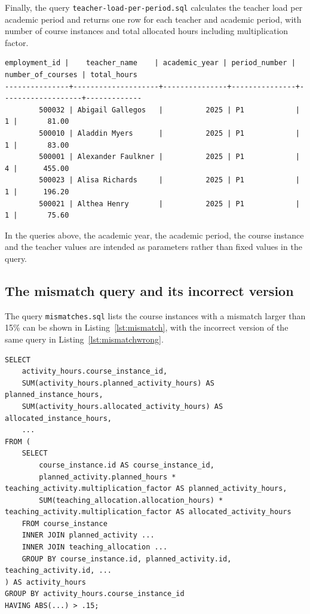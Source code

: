 \documentclass[a4paper]{scrartcl}
\renewcommand{\_}{\textunderscore\allowbreak}
\begin{document}
Finally, the query \texttt{teacher-load-per-period.sql} calculates the teacher load per academic period and returns one row for each teacher and academic period, with number of course instances and total allocated hours including multiplication factor.

\begin{lstlisting}[style=output, caption={The first 5 rows of the output of \texttt{teacher-load-per-period.sql}, which returns 383399 rows in total}, label={lst:outload}]
 employment_id |    teacher_name    | academic_year | period_number | number_of_courses | total_hours 
---------------+--------------------+---------------+---------------+-------------------+-------------
        500032 | Abigail Gallegos   |          2025 | P1            |                 1 |       81.00
        500010 | Aladdin Myers      |          2025 | P1            |                 1 |       83.00
        500001 | Alexander Faulkner |          2025 | P1            |                 4 |      455.00
        500023 | Alisa Richards     |          2025 | P1            |                 1 |      196.20
        500021 | Althea Henry       |          2025 | P1            |                 1 |       75.60
\end{lstlisting}

In the queries above, the academic year, the academic period, the course instance and the teacher values are intended as parameters rather than fixed values in the query.

\subsection{The mismatch query and its incorrect version}

The query \texttt{mismatches.sql} lists the course instances with a mismatch larger than 15\% can be shown in Listing~\ref{lst:mismatch}, with the incorrect version of the same query in Listing~\ref{lst:mismatchwrong}.

\begin{lstlisting}[style=SQL, caption={The correct mismatch query, where each side is aggregated before they are compared (shortened)}, label={lst:mismatch}]
SELECT
    activity_hours.course_instance_id,
    SUM(activity_hours.planned_activity_hours) AS planned_instance_hours,
    SUM(activity_hours.allocated_activity_hours) AS allocated_instance_hours,
    ...
FROM (
    SELECT
        course_instance.id AS course_instance_id,
        planned_activity.planned_hours * teaching_activity.multiplication_factor AS planned_activity_hours,
        SUM(teaching_allocation.allocation_hours) * teaching_activity.multiplication_factor AS allocated_activity_hours
    FROM course_instance
    INNER JOIN planned_activity ...
    INNER JOIN teaching_allocation ...
    GROUP BY course_instance.id, planned_activity.id, teaching_activity.id, ...
) AS activity_hours
GROUP BY activity_hours.course_instance_id
HAVING ABS(...) > .15;
\end{lstlisting}
\end{document}
